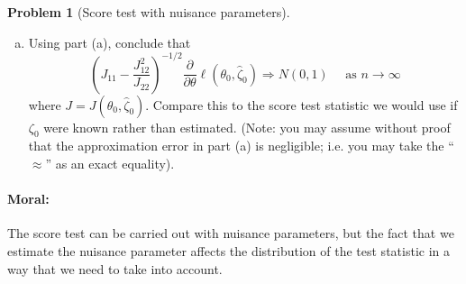 \documentclass{article}
\theoremstyle{definition}
\newtheorem{problem}{Problem}
\begin{document}
\begin{problem}[Score test with nuisance parameters]
\begin{enumerate}[(a)]
\item Using part (a), conclude that
\[
\left(J_{11} - \frac{J_{12}^2}{J_{22}}\right)^{-1/2}
\frac{\partial}{\partial\theta} \ell(\theta_0,\hat\zeta_0) \Rightarrow N(0,1) \quad \text{ as } n \to\infty
\]
where $J = J(\theta_0,\hat\zeta_0)$. Compare this to the score test statistic we would use if $\zeta_0$ were known rather than estimated. (Note: you may assume without proof that the approximation error in part (a) is negligible; i.e. you may take the ``$\approx$'' as an exact equality).





\end{enumerate}

\paragraph{Moral:} The score test can be carried out with nuisance parameters, but the fact that we estimate the nuisance parameter affects the distribution of the test statistic in a way that we need to take into account.
\end{problem}
\end{document}
